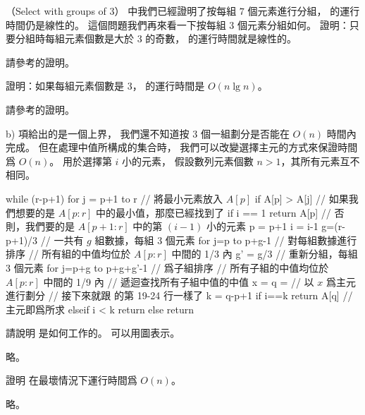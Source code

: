 \startPROBLEM
（Select with groups of 3）
\inexercise[9_3_1] 中我們已經證明了按每組 $7$ 個元素進行分組，
  的運行時間仍是線性的。
這個問題我們再來看一下按每組 $3$ 個元素分組如何。
\startigBase[a]\startitem
證明：只要分組時每組元素個數是大於 $3$ 的奇數，
  的運行時間就是線性的。
\stopitem\stopigBase

\startANSWER
請參考\inexercise[9_3_1] 的證明。
\stopANSWER

\startigBase[continue]\startitem
證明：如果每組元素個數是 $3$，
  的運行時間是 $O(n\lg{n})$。
\stopitem\stopigBase

\startANSWER
請參考\inexercise[9_3_1] 的證明。
\stopANSWER

b) 項給出的是一個上界，
我們還不知道按 $3$ 個一組劃分是否能在 $O(n)$ 時間內完成。
但在處理中值所構成的集合時，
我們可以改變選擇主元的方式來保證時間爲 $O(n)$。
  用於選擇第 $i$ 小的元素，
假設數列元素個數 $n>1$，其所有元素互不相同。

\startCLRSCODE
while (r-p+1)  
	for j = p+1 to r	// 將最小元素放入 $A[p]$
		if A[p] > A[j]
	// 如果我們想要的是 $A[p:r]$ 中的最小值，那麼已經找到了
	if i == 1
		return A[p]
	// 否則，我們要的是 $A[p+1:r]$ 中的第 $(i-1)$ 小的元素
	p = p+1
	i = i-1
g=(r-p+1)/3	// 一共有 $g$ 組數據，每組 $3$ 個元素
for j=p to p+g-1	// 對每組數據進行排序
// 所有組的中值均位於 $A[p:r]$ 中間的 1/3 內
g' = g/3	// 重新分組，每組 3 個元素
for j=p+g to p+g+g'-1	// 爲子組排序
// 所有子組的中值均位於 $A[p:r]$ 中間的 1/9 內
// 遞迴查找所有子組中值的中值
x = 
q = 	// 以 $x$ 爲主元進行劃分
// 接下來就跟  的第 19-24 行一樣了
k = q-p+1
if i==k
	return A[q]	// 主元即爲所求
elseif i < k
	return 
else
	return 
\stopCLRSCODE

\startigBase[continue]\startitem
請說明  是如何工作的。
可以用圖表示。
\stopitem\stopigBase

\startANSWER
略。
\stopANSWER

\startigBase[continue]\startitem
證明  在最壞情況下運行時間爲 $O(n)$。
\stopitem\stopigBase

\startANSWER
略。
\stopANSWER

\stopPROBLEM
